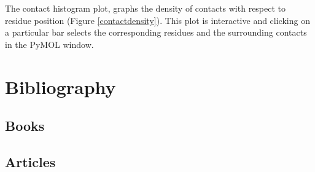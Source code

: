 \documentclass[11pt,fleqn]{book} %
\begin{document}
The contact histogram plot, graphs the density of contacts with respect to residue position (Figure \ref{contactdensity}). This plot is interactive and clicking on a particular bar selects the corresponding residues and the surrounding contacts in the PyMOL window.







\chapter*{Bibliography}
\section*{Books}
\printbibliography[heading=bibempty,type=book]
\section*{Articles}
\printbibliography[heading=bibempty,type=article]


\cleardoublepage
{}
\setlength{\columnsep}{0.75cm}
\printindex

\end{document}
